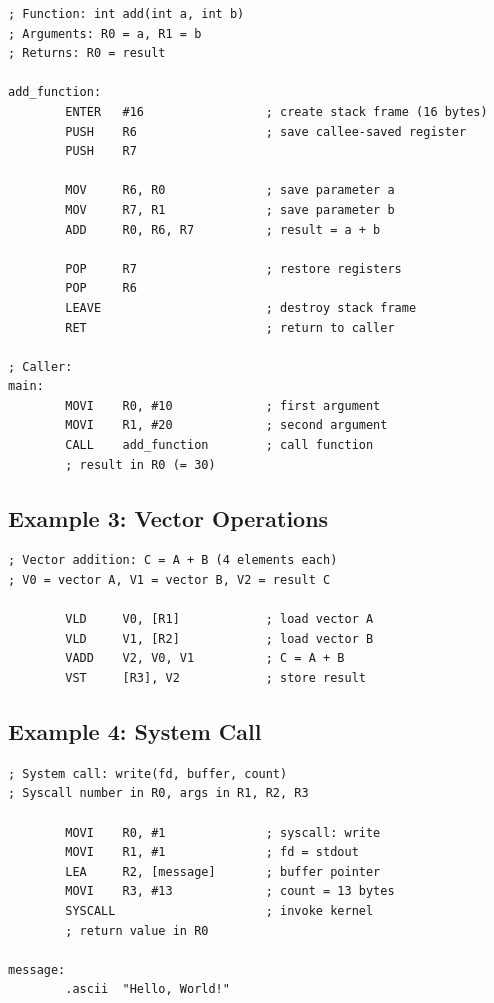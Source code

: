 \documentclass[12pt]{article}
\begin{document}
\begin{lstlisting}
; Function: int add(int a, int b)
; Arguments: R0 = a, R1 = b
; Returns: R0 = result

add_function:
        ENTER   #16                 ; create stack frame (16 bytes)
        PUSH    R6                  ; save callee-saved register
        PUSH    R7
        
        MOV     R6, R0              ; save parameter a
        MOV     R7, R1              ; save parameter b
        ADD     R0, R6, R7          ; result = a + b
        
        POP     R7                  ; restore registers
        POP     R6
        LEAVE                       ; destroy stack frame
        RET                         ; return to caller

; Caller:
main:
        MOVI    R0, #10             ; first argument
        MOVI    R1, #20             ; second argument
        CALL    add_function        ; call function
        ; result in R0 (= 30)
\end{lstlisting}

\subsection{Example 3: Vector Operations}

\begin{lstlisting}
; Vector addition: C = A + B (4 elements each)
; V0 = vector A, V1 = vector B, V2 = result C

        VLD     V0, [R1]            ; load vector A
        VLD     V1, [R2]            ; load vector B
        VADD    V2, V0, V1          ; C = A + B
        VST     [R3], V2            ; store result
\end{lstlisting}

\subsection{Example 4: System Call}

\begin{lstlisting}
; System call: write(fd, buffer, count)
; Syscall number in R0, args in R1, R2, R3

        MOVI    R0, #1              ; syscall: write
        MOVI    R1, #1              ; fd = stdout
        LEA     R2, [message]       ; buffer pointer
        MOVI    R3, #13             ; count = 13 bytes
        SYSCALL                     ; invoke kernel
        ; return value in R0

message:
        .ascii  "Hello, World!"
\end{lstlisting}
\end{document}
